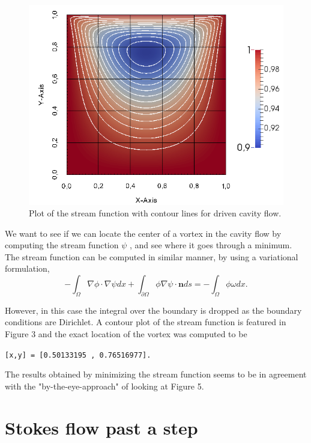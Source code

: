 \documentclass[11pt,a4paper,english]{article}
\numberwithin{equation}{section}
\begin{document}
\begin{figure}[h!]
\begin{center}
  \includegraphics[scale=0.4]{psi_square.png}
  \end{center}
  \caption{Plot of the stream function with contour lines for driven cavity flow.}
\end{figure}

We want to see if we can locate the center of a vortex in the cavity flow by computing the stream function $\psi$ , and see where it goes through a minimum. The stream function can be computed in similar manner, by using a variational formulation,  
\begin{equation}
-\int_\Omega \nabla \phi \cdot \nabla \psi dx + \int_{\partial \Omega} \phi \nabla \psi \cdot \mathbf{n} ds = - \int_\Omega \phi \omega dx.
\end{equation}

However, in this case the integral over the boundary is dropped as the boundary conditions are Dirichlet.
A contour plot of the stream function is featured in Figure 3 and the exact location of the vortex was computed to be 

\texttt{[x,y] =  [0.50133195 , 0.76516977].}

The results obtained by minimizing the stream function seems to be in agreement with the "by-the-eye-approach" of looking at Figure 5.  


\section{Stokes flow past a step}
\end{document}
